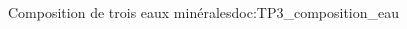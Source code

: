 \begin{doc}{Composition de trois eaux minérales}{doc:TP3_composition_eau}
\begin{multicols}{3}
  \end{multicols}
\end{doc}


